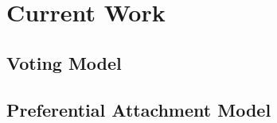 \documentclass[11pt]{article}
\begin{document}
\section{Current Work}
\subsection{Voting Model}
\subsection{Preferential Attachment Model}


%
%
\end{document}
